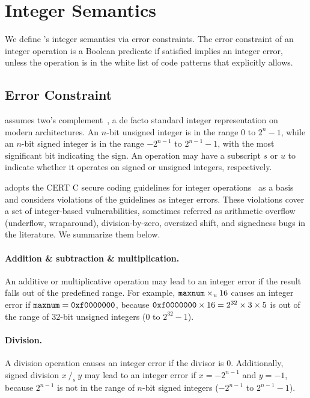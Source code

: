 \section{Integer Semantics}
\label{s:sema}

We define \sys's integer semantics via error constraints.  The error
constraint of an integer operation is a Boolean predicate if satisfied
implies an integer error, unless the operation is in the white list
of code patterns that \sys explicitly allows.

\subsection{Error Constraint}
\label{s:sema:constr}

\sys assumes two's complement~\cite[\chapterautorefname~4.2.1]{intel:vol1},
a de facto standard integer representation on modern architectures.
An $n$-bit unsigned integer is in the range $0$ to $2^n-1$, while
an $n$-bit signed integer is in the range $-2^{n-1}$ to $2^{n-1}-1$,
with the most significant bit indicating the sign.  An operation
may have a subscript $s$ or $u$ to indicate whether it operates on
signed or unsigned integers, respectively.

\sys adopts the CERT C secure coding guidelines for integer
operations~\cite[\chapterautorefname~5]{seacord:secure-c} as a basis
and considers violations of the guidelines as integer errors.  These
violations cover a set of integer-based vulnerabilities, sometimes
referred as arithmetic overflow (underflow, wraparound), division-by-zero,
oversized shift, and signedness bugs in the literature.  We summarize
them below.
\fi

\paragraph{Addition \& subtraction \& multiplication.}
An additive or multiplicative operation may lead to an integer error
if the result falls out of the predefined range.  For example,
$\texttt{maxnum}\times_u 16$ causes an integer error if $\texttt{maxnum} =
\texttt{0xf0000000}$, because $\texttt{0xf0000000} \times 16 = 2^{32}\times
3\times 5$ is out of the range of $32$-bit unsigned integers ($0$
to $2^{32} - 1$).

\paragraph{Division.}
A division operation causes an integer error if the divisor is 0.
Additionally, signed division $x\ /_s\ y$ may lead to an integer
error if $x = -2^{n-1}$ and $y = -1$, because $2^{n-1}$ is not in
the range of $n$-bit signed integers ($-2^{n-1}$ to $2^{n-1}-1$).

